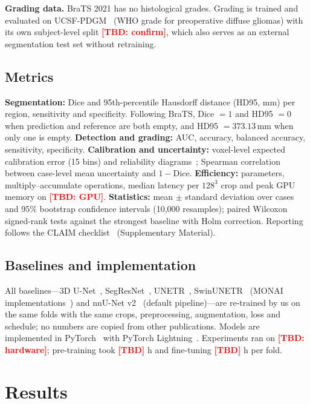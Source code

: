 \documentclass[pdflatex,sn-mathphys-num]{sn-jnl}
\newcommand{\tbd}[1][]{\textcolor{red}{\textbf{[TBD#1]}}}
\begin{document}
\textbf{Grading data.} BraTS 2021 has no histological grades. Grading is trained and evaluated on UCSF-PDGM~\cite{calabrese2022ucsfpdgm} (WHO grade for preoperative diffuse gliomas) with its own subject-level split \tbd[: confirm], which also serves as an external segmentation test set without retraining.

\subsection{Metrics}
\textbf{Segmentation:} Dice and 95th-percentile Hausdorff distance (HD95, mm) per region, sensitivity and specificity. Following BraTS, Dice $=1$ and HD95 $=0$ when prediction and reference are both empty, and HD95 $=373.13$\,mm when only one is empty.
\textbf{Detection and grading:} AUC, accuracy, balanced accuracy, sensitivity, specificity.
\textbf{Calibration and uncertainty:} voxel-level expected calibration error (15 bins) and reliability diagrams~\cite{guo2017calibration}; Spearman correlation between case-level mean uncertainty and $1-\mathrm{Dice}$.
\textbf{Efficiency:} parameters, multiply--accumulate operations, median latency per $128^3$ crop and peak GPU memory on \tbd[: GPU].
\textbf{Statistics:} mean $\pm$ standard deviation over cases and 95\% bootstrap confidence intervals (10,000 resamples); paired Wilcoxon signed-rank tests against the strongest baseline with Holm correction.
Reporting follows the CLAIM checklist~\cite{mongan2020claim} (Supplementary Material).

\subsection{Baselines and implementation}
All baselines---3D U-Net~\cite{cicek2016}, SegResNet~\cite{myronenko2019}, UNETR~\cite{hatamizadeh2022unetr}, SwinUNETR~\cite{tang2022swinunetr} (MONAI implementations~\cite{cardoso2022monai}) and nnU-Net v2~\cite{isensee2021nnunet} (default pipeline)---are re-trained by us on the same folds with the same crops, preprocessing, augmentation, loss and schedule; no numbers are copied from other publications. Models are implemented in PyTorch~\cite{paszke2019pytorch} with PyTorch Lightning~\cite{falcon2019lightning}. Experiments ran on \tbd[: hardware]; pre-training took \tbd{} h and fine-tuning \tbd{} h per fold.

\section{Results}\label{sec:results}
\end{document}
